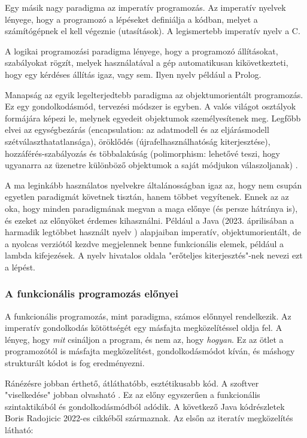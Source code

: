 \documentclass[12pt]{article}
\begin{document}
Egy másik nagy paradigma az imperatív programozás. Az imperatív nyelvek lényege, hogy a programozó a lépéseket definiálja a kódban, melyet a számítógépnek el kell végeznie (utasítások). A legismertebb imperatív nyelv a C.

A logikai programozási paradigma lényege, hogy a programozó állításokat, szabályokat rögzít, melyek használatával a gép automatikusan kikövetkezteti, hogy egy kérdéses állítás igaz, vagy sem. Ilyen nyelv például a Prolog.

Manapság az egyik legelterjedtebb paradigma az objektumorientált programozás. Ez egy gondolkodásmód, tervezési módszer is egyben. A valós világot osztályok formájára képezi le, melynek egyedeit objektumok személyesítenek meg. Legfőbb elvei az egységbezárás (encapsulation: az adatmodell és az eljárásmodell szétválaszthatatlansága), öröklődés (újrafelhasználhatóság kiterjesztése), hozzáférés-szabályozás és többalakúság (polimorphism: lehetővé teszi, hogy ugyanarra az üzenetre különböző objektumok a saját módjukon válaszoljanak) \cite{VD}.

A ma leginkább használatos nyelvekre általánosságban igaz az, hogy nem csupán egyetlen paradigmát követnek tisztán, hanem többet vegyítenek. Ennek az az oka, hogy minden paradigmának megvan a maga előnye (és persze hátránya is), és ezeket az előnyöket érdemes kihasználni. Például a Java (2023. áprilisában a harmadik legtöbbet használt nyelv \cite{TIO}) alapjaiban imperatív, objektumorientált, de a nyolcas verziótól kezdve \cite{Java} megjelennek benne funkcionális elemek, például a lambda kifejezések. A nyelv hivatalos oldala \cite{Java} "erőteljes kiterjesztés"-nek nevezi ezt a lépést.

\subsubsection{A funkcionális programozás előnyei}
A funkcionális programozás, mint paradigma, számos előnnyel rendelkezik. Az imperatív gondolkodás kötöttségét egy másfajta megközelítéssel oldja fel. A lényeg, hogy \textit{mit} csináljon a program, és nem az, hogy \textit{hogyan}. Ez az ötlet a programozótól is  másfajta megközelítést, gondolkodásmódot kíván, és máshogy strukturált kódot is fog eredményezni. 

Ránézésre jobban érthető, átláthatóbb, esztétikusabb kód. A szoftver "viselkedése" jobban olvasható \cite{CS}. Ez az előny egyszerűen a funkcionális szintaktikából és gondolkodásmódból adódik. A következő Java kódrészletek Boris Radojicic 2022-es cikkéből \cite{sy} származnak. Az elsőn az iteratív megközelítés látható:
\end{document}
